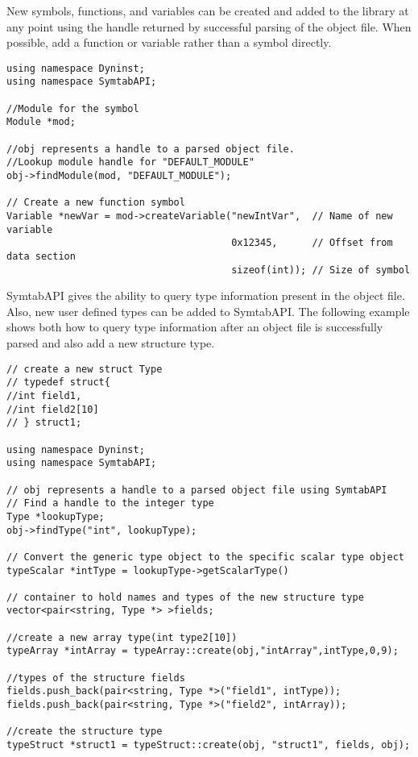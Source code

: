 New symbols, functions, and variables can be created and added to the library at any point using the handle returned by successful parsing of the object file. When possible, add a function or variable rather than a symbol directly. 

\begin{lstlisting}
using namespace Dyninst;
using namespace SymtabAPI;

//Module for the symbol
Module *mod;

//obj represents a handle to a parsed object file.
//Lookup module handle for "DEFAULT_MODULE" 
obj->findModule(mod, "DEFAULT_MODULE");

// Create a new function symbol
Variable *newVar = mod->createVariable("newIntVar",  // Name of new variable
                                       0x12345,      // Offset from data section
                                       sizeof(int)); // Size of symbol 
\end{lstlisting}

SymtabAPI gives the ability to query type information present in the object file. Also, new user defined types can be added to SymtabAPI. The following example shows both how to query type information after an object file is successfully parsed and also add a new structure type.

\begin{lstlisting}
// create a new struct Type
// typedef struct{
//int field1,
//int field2[10]
// } struct1;

using namespace Dyninst;
using namespace SymtabAPI;

// obj represents a handle to a parsed object file using SymtabAPI
// Find a handle to the integer type
Type *lookupType;
obj->findType("int", lookupType);

// Convert the generic type object to the specific scalar type object
typeScalar *intType = lookupType->getScalarType()

// container to hold names and types of the new structure type
vector<pair<string, Type *> >fields;

//create a new array type(int type2[10])
typeArray *intArray = typeArray::create(obj,"intArray",intType,0,9);

//types of the structure fields
fields.push_back(pair<string, Type *>("field1", intType));
fields.push_back(pair<string, Type *>("field2", intArray));

//create the structure type
typeStruct *struct1 = typeStruct::create(obj, "struct1", fields, obj);
\end{lstlisting}

